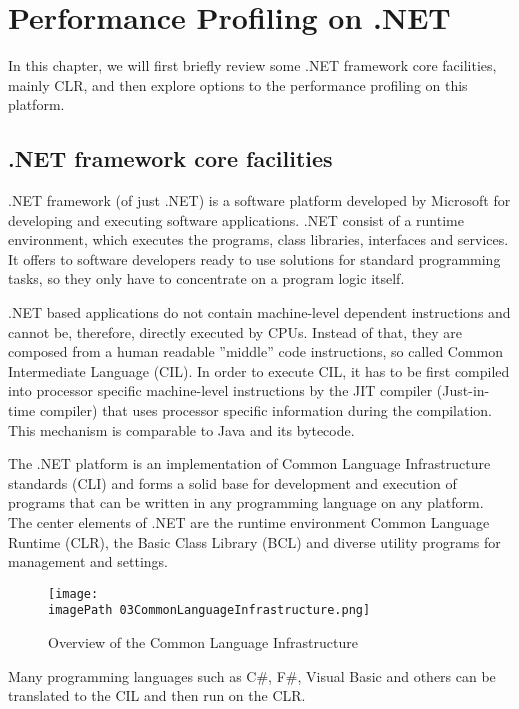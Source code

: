 
\chapter{Performance Profiling on .NET}
\label{chapPerProfOnDotNet}

In this chapter, we will first briefly review some .NET framework core facilities, mainly CLR, and then explore options to the performance profiling on this platform. 

\section{.NET framework core facilities}
.NET framework (of just .NET) is a software platform developed by Microsoft for developing and executing software applications. .NET  consist of a runtime environment, which executes the programs, class libraries, interfaces and services. It offers to software developers ready to use solutions for standard programming tasks, so they only have to concentrate on a program logic itself.

.NET based applications do not contain machine-level dependent instructions and cannot be, therefore, directly executed by CPUs. Instead of that, they are composed from a human readable ''middle'' code instructions, so called Common Intermediate Language (CIL). In order to execute CIL, it has to be first compiled into processor specific machine-level instructions by the JIT compiler (Just-in-time compiler) that uses processor specific information during the compilation. This mechanism is comparable to Java and its bytecode.

The .NET platform is an implementation of Common Language Infrastructure standards (CLI) and forms a solid base for development and execution of programs that can be written in any programming language on any platform. The center elements of .NET are the runtime environment Common Language Runtime (CLR), the Basic Class Library (BCL) and diverse utility programs for management and settings.

\begin{figure}
	\centering
		\texttt{[image: \\imagePath 03CommonLanguageInfrastructure.png]}
		\caption{Overview of the Common Language Infrastructure \cite{OCLI} }
	\label{fig:03CommonLanguageInfrastructure}
\end{figure}

Many programming languages such as C\#, F\#, Visual Basic and others can be translated to the CIL and then run on the CLR. 


